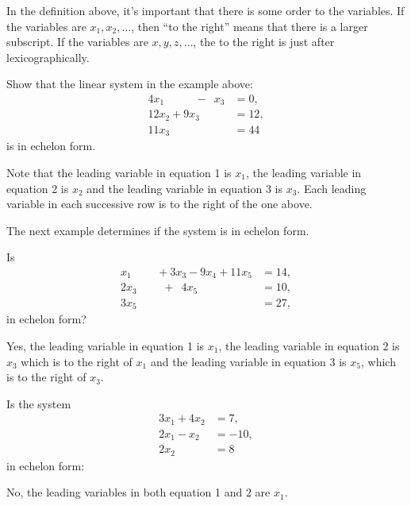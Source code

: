 In the definition above, it's important that there is some order to the variables.  If the variables are $x_1, x_2, \ldots$, then ``to the right'' means that there is a larger subscript.   If the variables are $x,y,z,\ldots$, the to the right is just after lexicographically.


\begin{example}

Show that  the linear system in the example above:
%
\begin{align*}
4x_1\phantom{+11x_3} -\phantom{9} x_3 & = 0, \\
 12x_2 +9x_3 & = 12, \\
11x_3 & =  44
\end{align*}
is in echelon form.

\solution

Note that the leading variable in equation 1 is $x_1$, the leading variable in equation 2 is $x_2$ and the leading variable in equation 3 is $x_3$.  Each leading variable in each successive row is to the right of the one above.

\end{example}

The next example determines if the system is in echelon form.

\pagebreak

\begin{example}  \label{eq:echelon:form:3by5}
Is
%
\begin{align*}
x_1\phantom{+2x_3} + 3x_3 -9 x_4 + 11 x_5 & = 14, \\
2x_3 \phantom{-9x_4} +\phantom{1} 4x_5 & = 10, \\
3x_5 & = 27,
\end{align*}
in echelon form?

\solution

Yes, the leading variable in equation 1 is $x_1$, the leading variable in equation 2 is $x_3$ which is to the right of $x_1$ and the leading variable in equation 3 is $x_5$, which is to the right of $x_3$.
\end{example}

\begin{example}
Is the system
%
\begin{align*}  %
3x_1 + 4 x_2 & = 7, \\
2x_1 -x_2 & = -10, \\
2x_2 & = 8
\end{align*}
in echelon form:

\solution

No,  the leading variables in both equation 1 and 2 are $x_1$.

\end{example}


